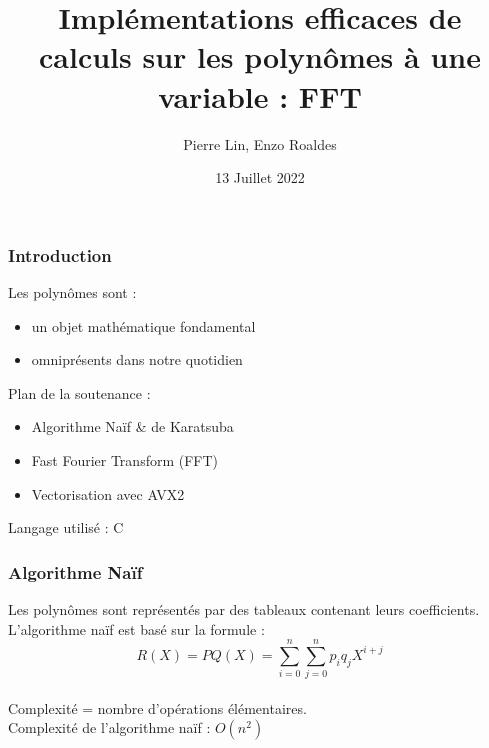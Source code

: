 \documentclass[8pt]{beamer}
\title{Implémentations efficaces de calculs sur les polynômes à une variable : FFT}
\author{Pierre Lin, Enzo Roaldes}
\institute{L2 DM-IM 2022, Sorbonne Université}
\date{13 Juillet 2022}
\begin{document}
\frame{\titlepage}


\begin{frame}
\frametitle{Introduction}

Les polynômes sont :
\begin{itemize}
    \item un objet mathématique fondamental
    \item omniprésents dans notre quotidien \newline
\end{itemize}

Plan de la soutenance :
\begin{itemize}
    \item Algorithme Naïf \& de Karatsuba
    \item Fast Fourier Transform (FFT)
    \item Vectorisation avec AVX2 \newline
\end{itemize}

Langage utilisé : C

\end{frame}


\begin{frame}
\frametitle{Algorithme Naïf}

Les polynômes sont représentés par des tableaux contenant leurs coefficients. \\[0.2cm]


L'algorithme naïf est basé sur la formule :
\[R(X) = PQ(X) =
\displaystyle\sum_{i=0}^{n}\sum_{j=0}^{n} p_i q_j X^{i+j}\]
\\[0.4cm]
Complexité = nombre d'opérations élémentaires.\\[0.4cm]
Complexité de l'algorithme naïf : $O(n^2)$


\end{frame}
\end{document}

